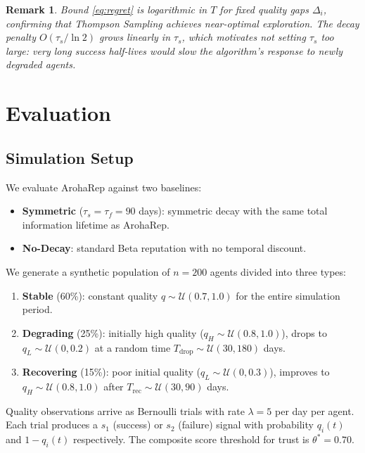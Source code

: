 \documentclass[conference]{IEEEtran}
\newtheorem{remark}{Remark}
\begin{document}
\begin{remark}
Bound \eqref{eq:regret} is logarithmic in $T$ for fixed
quality gaps $\Delta_i$, confirming that Thompson Sampling
achieves near-optimal exploration. The decay penalty
$O(\tau_s / \ln 2)$ grows linearly in $\tau_s$, which
motivates not setting $\tau_s$ too large: very long
success half-lives would slow the algorithm's response to
newly degraded agents.
\end{remark}

\section{Evaluation}
\label{sec:eval}

\subsection{Simulation Setup}

We evaluate ArohaRep against two baselines:
\begin{itemize}
  \item \textbf{Symmetric} ($\tau_s = \tau_f = 90$ days):
    symmetric decay with the same total information lifetime
    as ArohaRep.
  \item \textbf{No-Decay}: standard Beta reputation with no
    temporal discount.
\end{itemize}

We generate a synthetic population of $n = 200$ agents
divided into three types:
\begin{enumerate}
  \item \textbf{Stable} (60\%): constant quality $q \sim
    \mathcal{U}(0.7, 1.0)$ for the entire simulation period.
  \item \textbf{Degrading} (25\%): initially high quality
    ($q_H \sim \mathcal{U}(0.8, 1.0)$), drops to $q_L \sim
    \mathcal{U}(0, 0.2)$ at a random time $T_{\text{drop}}
    \sim \mathcal{U}(30, 180)$ days.
  \item \textbf{Recovering} (15\%): poor initial quality
    ($q_L \sim \mathcal{U}(0, 0.3)$), improves to $q_H \sim
    \mathcal{U}(0.8, 1.0)$ after $T_{\text{rec}} \sim
    \mathcal{U}(30, 90)$ days.
\end{enumerate}

Quality observations arrive as Bernoulli trials with rate
$\lambda = 5$ per day per agent. Each trial produces a
$s_1$ (success) or $s_2$ (failure) signal with probability
$q_i(t)$ and $1 - q_i(t)$ respectively. The composite score
threshold for trust is $\theta^* = 0.70$.
\end{document}
